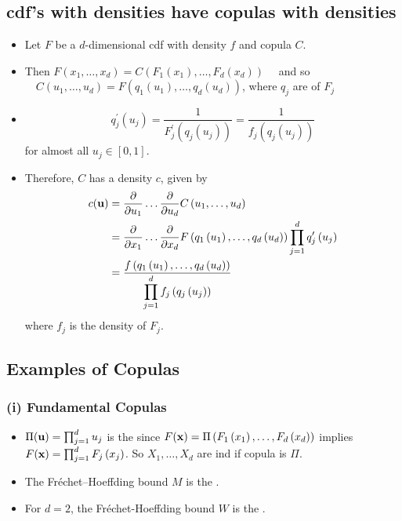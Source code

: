 \subsection*{cdf’s with densities have copulas with densities}
\begin{itemize}[leftmargin=*]
    \item Let $F$ be a $d$-dimensional cdf with density $f$ and copula $C$.
    \item Then
$F\left(x_{1}, \ldots, x_{d}\right)=C\left(F_{1}\left(x_{1}\right), \ldots, F_{d}\left(x_{d}\right)\right) \quad$ and so $\quad C\left(u_{1}, \ldots, u_{d}\right)=F\left(q_{1}\left(u_{1}\right), \ldots, q_{d}\left(u_{d}\right)\right)$, 
where $q_{j}$ are  of $F_{j}$
    \item $$
q_{j}^{\prime}\left(u_{j}\right)=\frac{1}{F_{j}^{\prime}\left(q_{j}\left(u_{j}\right)\right)}=\frac{1}{f_{j}\left(q_{j}\left(u_{j}\right)\right)}
$$
for almost all $u_{j} \in[0,1]$.
    \item Therefore, $C$ has a density $c$, given by
$$
\begin{aligned}
c(\operatorname{\boldsymbol{\mathbf{u}}}) &=\frac{\partial}{\partial u_{1}} \ldots \frac{\partial}{\partial u_{d}} C\left(u_{1}, \ldots, u_{d}\right) \\
&=\frac{\partial}{\partial x_{1}} \ldots \frac{\partial}{\partial x_{d}} F\left(q_{1}\left(u_{1}\right), \ldots, q_{d}\left(u_{d}\right)\right) \prod_{j=1}^{d} q_{j}^{\prime}\left(u_{j}\right) \\
&=\frac{f\left(q_{1}\left(u_{1}\right), \ldots, q_{d}\left(u_{d}\right)\right)}{\displaystyle \prod_{j=1}^{d} f_{j}\left(q_{j}\left(u_{j}\right)\right)}
\end{aligned}
$$
where $f_{j}$ is the density of $F_{j}$.
\end{itemize}





\subsection*{Examples of Copulas}
\subsubsection*{(i) Fundamental Copulas}
\begin{itemize}[leftmargin=*]
    \item $\Pi(\operatorname{\boldsymbol{\mathbf{u}}})=\prod_{j=1}^{d} u_{j}$ is the  since
$F(\operatorname{\boldsymbol{\mathbf{x}}})=\Pi\left(F_{1}\left(x_{1}\right), \ldots, F_{d}\left(x_{d}\right)\right)$ implies $F(\operatorname{\boldsymbol{\mathbf{x}}})=\prod_{j=1}^{d} F_{j}\left(x_{j}\right)$. So $X_{1}, \ldots, X_{d}$ are ind if copula is $\Pi$.
    \item The Fréchet–Hoeffding bound $M$ is the .
    \item For $d=2$, the Fréchet-Hoeffding bound $W$ is the .
\end{itemize}





